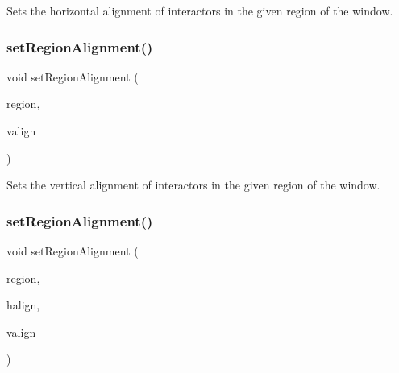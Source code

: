 Sets the horizontal alignment of interactors in the given region of the window. 

\mbox{\label{classGWindow_a926942899d029fc9921fe770ac2867bb}} 
\subsubsection{\texorpdfstring{set\+Region\+Alignment()}{setRegionAlignment()}\hspace{0.1cm}{\footnotesize\ttfamily [2/5]}}
{\footnotesize\ttfamily void set\+Region\+Alignment (\begin{DoxyParamCaption}\item[{\mbox{\hyperlink{classGWindow_a81a01a86de31071a92e6cce0bab9bc4b}{Region}}}]{region,  }\item[{Vertical\+Alignment}]{valign }\end{DoxyParamCaption})\hspace{0.3cm}{\ttfamily [virtual]}}



Sets the vertical alignment of interactors in the given region of the window. 

\mbox{\label{classGWindow_ab4d2bfcca7a18da2847e7b4494da4a16}} 
\subsubsection{\texorpdfstring{set\+Region\+Alignment()}{setRegionAlignment()}\hspace{0.1cm}{\footnotesize\ttfamily [3/5]}}
{\footnotesize\ttfamily void set\+Region\+Alignment (\begin{DoxyParamCaption}\item[{\mbox{\hyperlink{classGWindow_a81a01a86de31071a92e6cce0bab9bc4b}{Region}}}]{region,  }\item[{Horizontal\+Alignment}]{halign,  }\item[{Vertical\+Alignment}]{valign }\end{DoxyParamCaption})\hspace{0.3cm}{\ttfamily [virtual]}}



